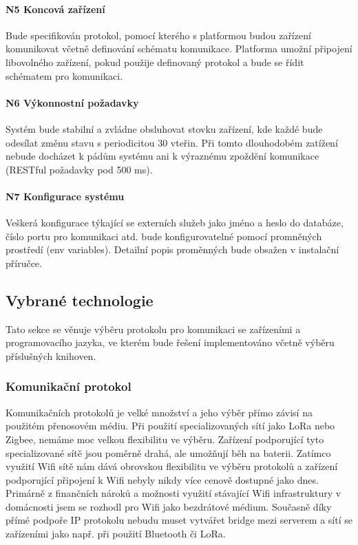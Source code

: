 \paragraph{N5 Koncová zařízení}
Bude specifikován protokol, pomocí kterého s platformou budou zařízení komunikovat včetně definování schématu komunikace. Platforma umožní připojení libovolného zařízení, pokud použije definovaný protokol a bude se řídit schématem pro komunikaci.

\paragraph{N6 Výkonnostní požadavky}
Systém bude stabilní a zvládne obsluhovat stovku zařízení, kde každé bude odesílat změnu stavu s periodicitou 30 vteřin. Při tomto dlouhodobém zatížení nebude docházet k pádům systému ani k výraznému zpoždění komunikace (RESTful požadavky pod 500 ms).

\paragraph{N7 Konfigurace systému}
Veškerá konfigurace týkající se externích služeb jako jméno a heslo do databáze, číslo portu pro komunikaci atd. bude konfigurovatelné pomocí promněných prostředí (env variables). Detailní popis proměnných bude obsažen v instalační příručce.


\subsection{Vybrané technologie}
Tato sekce se věnuje výběru protokolu pro komunikaci se zařízeními a programovacího jazyka, ve kterém bude řešení implementováno včetně výběru příslušných knihoven.

\subsubsection{Komunikační protokol}
Komunikačních protokolů je velké množství a jeho výběr přímo závisí na použitém přenosovém médiu. Při použití specializovaných sítí jako LoRa nebo Zigbee, nemáme moc velkou flexibilitu ve výběru. Zařízení podporující tyto specializované sítě jsou poměrně drahá, ale umožňují běh na baterii. Zatímco využití Wifi sítě nám dává obrovskou flexibilitu ve výběru protokolů a zařízení podporující připojení k Wifi nebyly nikdy více cenově dostupné jako dnes. Primárně z finančních nároků a možnosti využití stávající Wifi infrastruktury v domácnosti jsem se rozhodl pro Wifi jako bezdrátové médium. Současně díky přímé podpoře IP protokolu nebudu muset vytvářet bridge mezi serverem a sítí se zařízeními jako např. při použití Bluetooth či LoRa.

